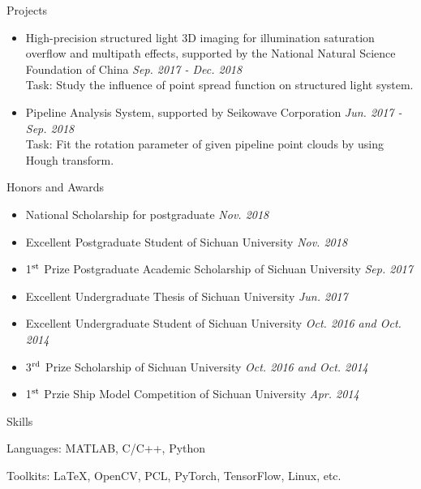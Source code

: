 \documentclass{resume} %
\begin{document}
\begin{rSection}{Projects}
\begin{itemize}[leftmargin=*]
		\item  High-precision structured light 3D imaging for illumination saturation overflow and multipath effects, supported by the National Natural Science Foundation of China 
		\hfill {\em Sep. 2017 - Dec. 2018}\vspace{1.5mm}\\		
		Task: Study the influence of point spread function on structured light system.
		
		\item  Pipeline Analysis System, supported by Seikowave Corporation 
		\hfill {\em Jun. 2017 - Sep. 2018}\vspace{1.5mm}\\		
		Task: Fit the rotation parameter of given pipeline point clouds by using Hough transform.
							
	\end{itemize}
\end{rSection}

\begin{rSection}{Honors and Awards}
	\begin{itemize}[leftmargin=*]
		\item National Scholarship for postgraduate \hfill {\em Nov. 2018}
		\item Excellent Postgraduate Student of Sichuan University \hfill {\em Nov. 2018} 
		\item {1$^{\rm st}$} Prize Postgraduate Academic Scholarship of Sichuan University \hfill {\em Sep. 2017}
		\item Excellent Undergraduate Thesis of Sichuan University \hfill {\em Jun. 2017}
		\item Excellent Undergraduate Student of Sichuan University \hfill {\em Oct. 2016 and Oct. 2014} 
		\item {3$^{\rm rd}$} Prize Scholarship of Sichuan University \hfill {\em Oct. 2016 and Oct. 2014}
		\item {1$^{\rm st}$} Przie Ship Model Competition of Sichuan University \hfill {\em Apr. 2014}
	\end{itemize}
	
\end{rSection}

\begin{rSection}{Skills}
	\item Languages: MATLAB, C/C++, Python
	\item Toolkits: \LaTeX, OpenCV, PCL, PyTorch, TensorFlow, Linux, etc.
\end{rSection}
\end{document}

